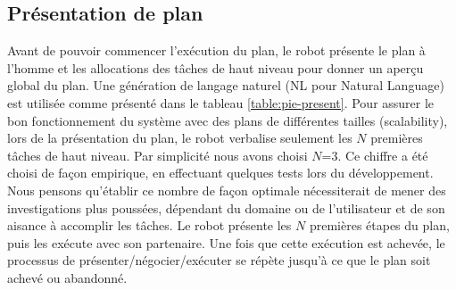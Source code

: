 \documentclass[a4paper,11pt,twoside]{StyleThese}
\begin{document}
\subsection{Présentation de plan}

Avant de pouvoir commencer l'exécution du plan, le robot présente le plan à l'homme et les allocations des tâches de haut niveau pour donner un aperçu global du plan. Une génération de langage naturel (NL pour Natural Language) est utilisée comme présenté dans le tableau \ref{table:pie-present}. 
Pour assurer le bon fonctionnement du système avec des plans de différentes tailles (scalability), lors de la présentation du plan, le robot verbalise seulement les  $N$ premières tâches de haut niveau. Par simplicité nous avons choisi $N$=$3$. Ce chiffre a été choisi de façon empirique, en effectuant quelques tests lors du développement. Nous pensons qu'établir ce nombre de façon optimale nécessiterait de mener des investigations plus poussées, dépendant du domaine ou de l'utilisateur et de son aisance à accomplir les tâches. Le robot présente les $N$ premières étapes du plan, puis les exécute avec son partenaire. Une fois que cette exécution est achevée, le processus de présenter/négocier/exécuter se répète jusqu'à ce que le plan soit achevé ou abandonné.


 
\end{document}
